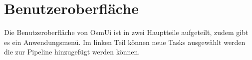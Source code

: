 \documentclass[a4paper,10pt]{scrartcl}
\begin{document}
\section{Benutzeroberfläche}
Die Benutzeroberfläche von OsmUi ist in zwei Hauptteile aufgeteilt, zudem gibt es ein Anwendungsmenü. Im linken Teil können neue Tasks ausgewählt werden die zur
Pipeline hinzugefügt werden können.
\end{document}
